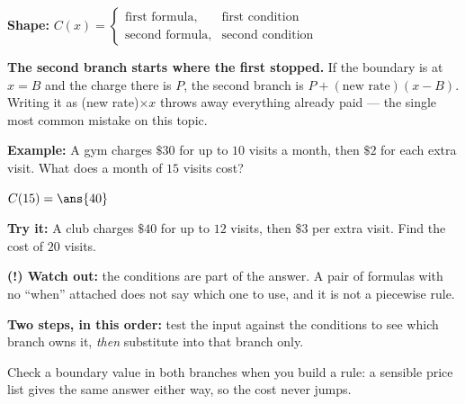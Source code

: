 \documentclass[12pt]{article}
\begin{document}


\begin{formulabox}
\textbf{Shape:} \quad $C(x) = \begin{cases} \text{first formula},& \text{first condition} \\ \text{second formula},& \text{second condition}\end{cases}$\par\smallskip
\textbf{The second branch starts where the first stopped.} If the boundary is at $x = B$ and the charge there is $P$, the second branch is $P + (\text{new rate})(x - B)$. Writing it as (new rate)$\times x$ throws away everything already paid --- the single most common mistake on this topic.
\end{formulabox}

\begin{examplebox}
\textbf{Example:} \quad A gym charges $\$30$ for up to $10$ visits a month, then $\$2$ for each extra visit. What does a month of $15$ visits cost?
\par
$C(15) = \ans{40}$
\end{examplebox}

\begin{tryitbox}
\textbf{Try it:} \quad A club charges $\$40$ for up to $12$ visits, then $\$3$ per extra visit. Find the cost of $20$ visits.\\[2pt]
\end{tryitbox}

\begin{watchoutbox}
\textbf{(!) Watch out:} the conditions are part of the answer. A pair of formulas with no ``when'' attached does not say which one to use, and it is not a piecewise rule.
\end{watchoutbox}


\begin{formulabox}
\textbf{Two steps, in this order:} test the input against the conditions to see which branch owns it, \emph{then} substitute into that branch only.\par\smallskip
Check a boundary value in both branches when you build a rule: a sensible price list gives the same answer either way, so the cost never jumps.
\end{formulabox}
\end{document}
